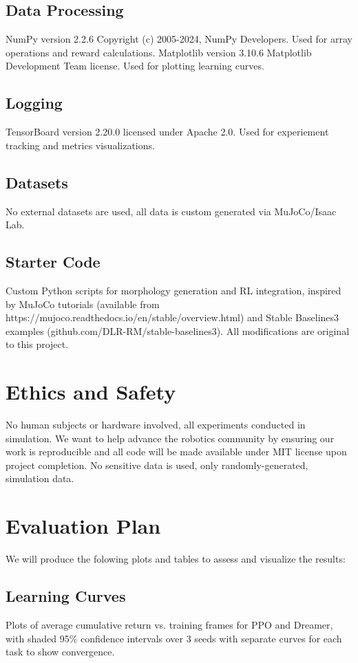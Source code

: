 \documentclass[conference]{IEEEtran}
\begin{document}
\subsection{Data Processing}
NumPy version 2.2.6 Copyright (c) 2005-2024, NumPy Developers.
Used for array operations and reward calculations.
Matplotlib version 3.10.6 Matplotlib Development Team license.
Used for plotting learning curves.

\subsection{Logging}
TensorBoard version 2.20.0 licensed under Apache 2.0.
Used for experiement tracking and metrics visualizations.

\subsection{Datasets}
No external datasets are used, all data is custom generated via MuJoCo/Isaac Lab.

\subsection{Starter Code}
Custom Python scripts for morphology generation and RL integration, inspired by MuJoCo tutorials (available from https://mujoco.readthedocs.io/en/stable/overview.html) and Stable Baselines3 examples (github.com/DLR-RM/stable-baselines3).
All modifications are original to this project.

\section{Ethics and Safety}
No human subjects or hardware involved, all experiments conducted in simulation.
We want to help advance the robotics community by ensuring our work is reproducible and all code will be made available under MIT license upon project completion.
No sensitive data is used, only randomly-generated, simulation data.

\section{Evaluation Plan}
We will produce the folowing plots and tables to assess and visualize the results:

\subsection{Learning Curves}
Plots of average cumulative return vs. training frames for PPO and Dreamer, with shaded 95\% confidence intervals over 3 seeds with separate curves for each task to show convergence.
\end{document}
